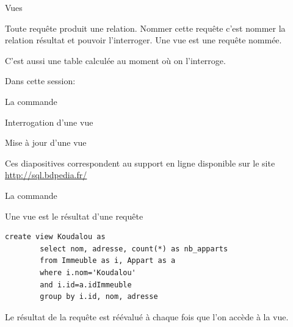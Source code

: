 
\begin{frame}[fragile]{Vues}

Toute requête produit une relation. Nommer cette requête
c'est nommer la relation résultat et pouvoir l'interroger.
\alert{Une vue est une requête nommée}.

\vfill

C'est aussi une table \alert{calculée} au moment où on l'interroge.

\vfill

Dans cette session:

\begin{redbullet}
  \item La commande 
  \item Interrogation d'une vue
  \item Mise à jour d'une vue
\end{redbullet}

\vfill
\begin{blocgauche}
\alert{Ces diapositives correspondent au support en ligne disponible sur
le site \url{http://sql.bdpedia.fr/}}
\end{blocgauche}

\end{frame}

\begin{frame}[fragile]{La commande }

Une vue est 
le résultat d'une requête 

\vfill

\begin{verbatim}
create view Koudalou as 
        select nom, adresse, count(*) as nb_apparts 
        from Immeuble as i, Appart as a 
        where i.nom='Koudalou'
        and i.id=a.idImmeuble
        group by i.id, nom, adresse
\end{verbatim}

\vfill

\begin{blocgauche}
Le résultat de la requête
est réévalué à chaque fois que l'on accède à la vue. 
\end{blocgauche}
\end{frame}


